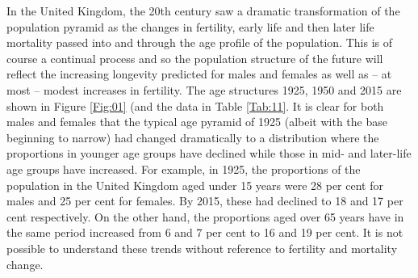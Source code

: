 \documentclass[11 pt, a4paper]{report}
\begin{document}
In the United Kingdom, the 20th century saw a dramatic transformation of the population pyramid as the changes in fertility, early life and then later life mortality passed into and through the age profile of the population. This is of course a continual process and so the population structure of the future will reflect the increasing longevity predicted for males and females as well as – at most – modest increases in fertility. The age structures 1925, 1950 and 2015 are shown in Figure \ref{Fig:01} (and the data in Table \ref{Tab:11}. It is clear for both males and females that the typical age pyramid of 1925 (albeit with the base beginning to narrow) had changed dramatically to a distribution where the proportions in younger age groups have declined while those in mid- and later-life age groups have increased. For example, in 1925, the proportions of the population in the United Kingdom aged under 15 years were 28 per cent for males and 25 per cent for females. By 2015, these had declined to 18 and 17 per cent respectively. On the other hand, the proportions aged over 65 years have in the same period increased from 6 and 7 per cent to 16 and 19 per cent.  It is not possible to understand these trends without reference to fertility and mortality change.
\end{document}
